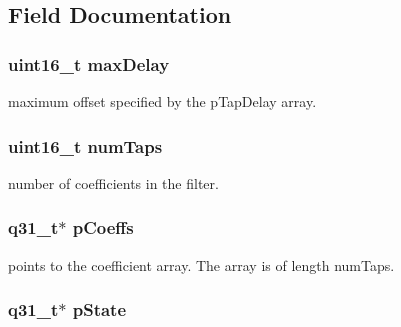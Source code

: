 \subsection{Field Documentation}
\hypertarget{structarm__fir__sparse__instance__q31_ab25f4ee7550e6d92acff77ada283733f}{
\subsubsection[{max\-Delay}]{\setlength{\rightskip}{0pt plus 5cm}uint16\-\_\-t max\-Delay}}\label{structarm__fir__sparse__instance__q31_ab25f4ee7550e6d92acff77ada283733f}
maximum offset specified by the p\-Tap\-Delay array. \hypertarget{structarm__fir__sparse__instance__q31_a751941891e47f522a7f5375fe8990aac}{
\subsubsection[{num\-Taps}]{\setlength{\rightskip}{0pt plus 5cm}uint16\-\_\-t num\-Taps}}\label{structarm__fir__sparse__instance__q31_a751941891e47f522a7f5375fe8990aac}
number of coefficients in the filter. \hypertarget{structarm__fir__sparse__instance__q31_a68888e36167d81cb7836db10367a1682}{
\subsubsection[{p\-Coeffs}]{\setlength{\rightskip}{0pt plus 5cm}q31\-\_\-t$\ast$ p\-Coeffs}}\label{structarm__fir__sparse__instance__q31_a68888e36167d81cb7836db10367a1682}
points to the coefficient array. The array is of length num\-Taps. \hypertarget{structarm__fir__sparse__instance__q31_adee4ba3ee8869865af7d8fa08ca913d6}{
\subsubsection[{p\-State}]{\setlength{\rightskip}{0pt plus 5cm}q31\-\_\-t$\ast$ p\-State}}\label{structarm__fir__sparse__instance__q31_adee4ba3ee8869865af7d8fa08ca913d6}
